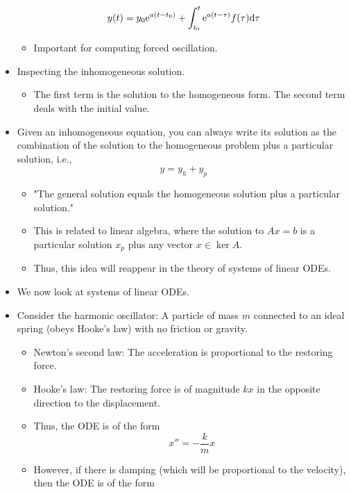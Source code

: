 \documentclass[../notes.tex]{subfiles}
\begin{document}
\begin{itemize}
\begin{equation*}
        y(t) = y_0\e[a(t-t_0)]+\int_{t_0}^t\e[a(t-\tau)]f(\tau)\dd\tau
    \end{equation*}
    \begin{itemize}
        \item Important for computing forced oscillation.
    \end{itemize}
    \item Inspecting the inhomogeneous solution.
    \begin{itemize}
        \item The first term is the solution to the homogeneous form. The second term deals with the initial value.
    \end{itemize}
    \item Given an inhomogeneous equation, you can always write its solution as the combination of the solution to the homogeneous problem plus a particular solution, i.e.,
    \begin{equation*}
        y = y_h+y_p
    \end{equation*}
    \begin{itemize}
        \item "The general solution equals the homogeneous solution plus a particular solution."
        \item This is related to linear algebra, where the solution to $Ax=b$ is a particular solution $x_p$ plus any vector $x\in\ker A$.
        \item Thus, this idea will reappear in the theory of systems of linear ODEs.
    \end{itemize}
    \item We now look at systems of linear ODEs.
    \item Consider the harmonic oscillator: A particle of mass $m$ connected to an ideal spring (obeys Hooke's law) with no friction or gravity.
    \begin{itemize}
        \item Newton's second law: The acceleration is proportional to the restoring force.
        \item Hooke's law: The restoring force is of magnitude $kx$ in the opposite direction to the displacement.
        \item Thus, the ODE is of the form
        \begin{equation*}
            x'' = -\frac{k}{m}x
        \end{equation*}
        \item However, if there is damping (which will be proportional to the velocity), then the ODE is of the form

\end{itemize}
\end{itemize}
\end{document}
